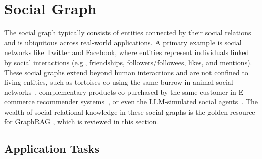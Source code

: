 \section{Social Graph \texorpdfstring{\emojisoctitle}{Social Graph}}
\label{sec-soc}

The social graph typically consists of entities connected by their social relations and is ubiquitous across real-world applications. A primary example is social networks like Twitter and Facebook, where entities represent individuals linked by social interactions (e.g., friendships, followers/followees, likes, and mentions). These social graphs extend beyond human interactions and are not confined to living entities, such as tortoises co-using the same burrow in animal social networks~\cite{rossi2015network}, complementary products co-purchased by the same customer in E-commerce recommender systems~\cite{wang2024knowledge2, wu2024stark}, or even the LLM-simulated social agents~\cite{zhang2023exploring, li2023metaagents}. The wealth of social-relational knowledge in these social graphs is the golden resource for GraphRAG\cite{zeng2024large, jiang2023social, xie2023factual, wang2024augmenting, zeng2024federated, wang2024knowledge2, deldjoo2024review, du2024large, wu2024stark, huang2021graph, zhang2021learning, qiu2020exploiting, wei2024llmrec, kim2020retrieval, tian2021joint}
, which is reviewed in this section.


\subsection{Application Tasks}

